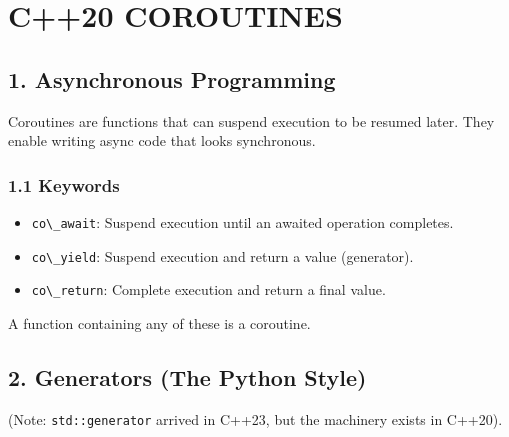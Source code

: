 \hypertarget{c20-coroutines}{%
\chapter{C++20 COROUTINES}\label{c20-coroutines}}

\hypertarget{asynchronous-programming}{%
\section{1. Asynchronous Programming}\label{asynchronous-programming}}

Coroutines are functions that can suspend execution to be resumed later.
They enable writing async code that looks synchronous.

\hypertarget{keywords}{%
\subsection{1.1 Keywords}\label{keywords}}

\begin{itemize}
\tightlist
\item
  \passthrough{\lstinline!co\_await!}: Suspend execution until an
  awaited operation completes.
\item
  \passthrough{\lstinline!co\_yield!}: Suspend execution and return a
  value (generator).
\item
  \passthrough{\lstinline!co\_return!}: Complete execution and return a
  final value.
\end{itemize}

A function containing any of these is a coroutine.

\hypertarget{generators-the-python-style}{%
\section{2. Generators (The Python
Style)}\label{generators-the-python-style}}

(Note: \passthrough{\lstinline!std::generator!} arrived in C++23, but
the machinery exists in C++20).

